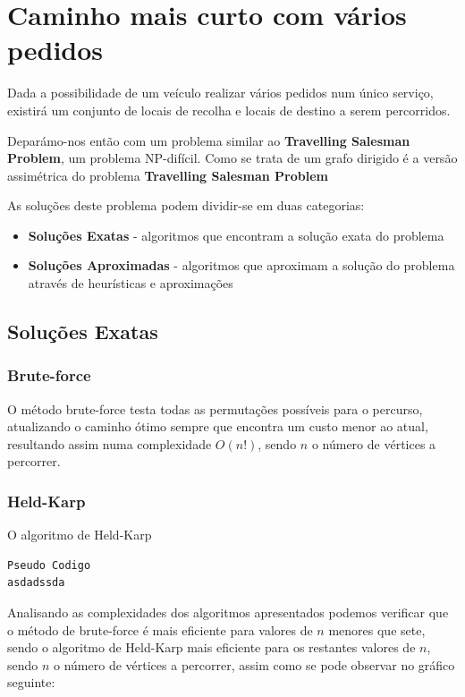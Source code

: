 \documentclass[article, a4paper, 12pt, oneside]{memoir}
\begin{document}
\section{Caminho mais curto com vários pedidos}
Dada a possibilidade de um veículo realizar vários pedidos num único serviço, existirá um conjunto de locais de recolha e locais de destino a serem percorridos.

Deparámo-nos então com um problema similar ao \textbf{Travelling Salesman Problem}, um problema NP-difícil. Como se trata de um grafo dirigido é a versão assimétrica do problema \textbf{Travelling Salesman Problem}

As soluções deste problema podem dividir-se em duas categorias:
\begin{itemize}
	\item \textbf{Soluções Exatas} - algoritmos que encontram a solução exata do problema
	\item \textbf{Soluções Aproximadas} - algoritmos que aproximam a solução do problema através de heurísticas e aproximações
\end{itemize}

\subsection{Soluções Exatas}
\subsubsection{Brute-force}
O método brute-force testa todas as permutações possíveis para o percurso, atualizando o caminho ótimo sempre que encontra um custo menor ao atual, resultando assim numa complexidade $O(n!)$, sendo $n$ o número de vértices a percorrer.

\subsubsection{Held-Karp}

O algoritmo de Held-Karp

\begin{lstlisting}[frame=single, mathescape=true]
Pseudo Codigo
asdadssda
\end{lstlisting}

Analisando as complexidades dos algoritmos apresentados podemos verificar que o método de brute-force é mais eficiente para valores de $n$ menores que sete, sendo o algoritmo de Held-Karp mais eficiente para os restantes valores de $n$, sendo $n$ o número de vértices a percorrer, assim como se pode observar no gráfico seguinte:
\end{document}
